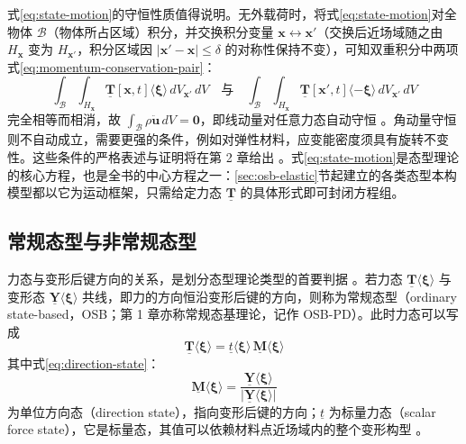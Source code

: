 式\eqref{eq:state-motion}的守恒性质值得说明。无外载荷时，将式\eqref{eq:state-motion}对全物体 $\mathcal{B}$（物体所占区域）积分，并交换积分变量 $\mathbf{x}\leftrightarrow\mathbf{x}'$（交换后近场域随之由 $H_{\mathbf{x}}$ 变为 $H_{\mathbf{x}'}$，积分区域因 $|\mathbf{x}'-\mathbf{x}|\le\delta$ 的对称性保持不变），可知双重积分中两项式\eqref{eq:momentum-conservation-pair}：
\begin{equation}
  \int_{\mathcal{B}}\int_{H_{\mathbf{x}}}\underline{\mathbf{T}}[\mathbf{x},t]\langle\boldsymbol{\xi}\rangle\,dV_{\mathbf{x}'}\,dV
  \quad\text{与}\quad
  \int_{\mathcal{B}}\int_{H_{\mathbf{x}}}\underline{\mathbf{T}}[\mathbf{x}',t]\langle-\boldsymbol{\xi}\rangle\,dV_{\mathbf{x}'}\,dV
  \label{eq:momentum-conservation-pair}
\end{equation}
完全相等而相消，故 $\int_{\mathcal{B}}\rho\ddot{\mathbf{u}}\,dV=\mathbf{0}$，即线动量对任意力态自动守恒 \cite{Silling2007}。角动量守恒则不自动成立，需要更强的条件，例如对弹性材料，应变能密度须具有旋转不变性。这些条件的严格表述与证明将在第 2 章给出 \cite{SillingLehoucq2010}。式\eqref{eq:state-motion}是态型理论的核心方程，也是全书的中心方程之一：\ref{sec:osb-elastic}节起建立的各类态型本构模型都以它为运动框架，只需给定力态 $\underline{\mathbf{T}}$ 的具体形式即可封闭方程组。

\subsection{常规态型与非常规态型}\label{sec:osb-nosb}

力态与变形后键方向的关系，是划分态型理论类型的首要判据 \cite{Silling2007}。若力态 $\underline{\mathbf{T}}\langle\boldsymbol{\xi}\rangle$ 与变形态 $\underline{\mathbf{Y}}\langle\boldsymbol{\xi}\rangle$ 共线，即力的方向恒沿变形后键的方向，则称为常规态型（ordinary state-based，OSB；第 1 章亦称常规态基理论，记作 OSB-PD）。此时力态可以写成
\begin{equation}
  \underline{\mathbf{T}}\langle\boldsymbol{\xi}\rangle=\underline{t}\langle\boldsymbol{\xi}\rangle\,\underline{\mathbf{M}}\langle\boldsymbol{\xi}\rangle
  \label{eq:osb-force}
\end{equation}
其中式\eqref{eq:direction-state}：
\begin{equation}
  \underline{\mathbf{M}}\langle\boldsymbol{\xi}\rangle=\frac{\underline{\mathbf{Y}}\langle\boldsymbol{\xi}\rangle}{\bigl|\underline{\mathbf{Y}}\langle\boldsymbol{\xi}\rangle\bigr|}
  \label{eq:direction-state}
\end{equation}
为单位方向态（direction state），指向变形后键的方向；$\underline{t}$ 为标量力态（scalar force state），它是标量态，其值可以依赖材料点近场域内的整个变形构型 \cite{Silling2007}。

